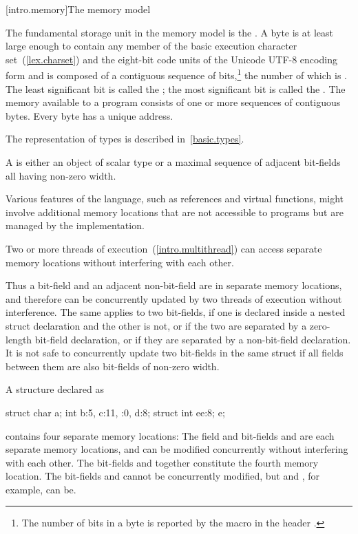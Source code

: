 [intro.memory]{The \Cpp memory model}

\pnum
{}%
The fundamental storage unit in the \Cpp memory model is the
.
A byte is at least large enough to contain any member of the basic
%
execution character set~(\ref{lex.charset})
and the eight-bit code units of the Unicode UTF-8 encoding form
and is composed of a contiguous sequence of
bits,\footnote{The number of bits in a byte is reported by the macro
 in the header .}
the number of which is . The least
significant bit is called the ; the most
significant bit is called the . The memory
available to a \Cpp program consists of one or more sequences of
contiguous bytes. Every byte has a unique address.

\pnum
\begin{note} The representation of types is described
in~\ref{basic.types}. \end{note}

\pnum
A  is either an object of scalar type or a maximal
sequence of adjacent bit-fields all having non-zero width. \begin{note} Various
features of the language, such as references and virtual functions, might
involve additional memory locations that are not accessible to programs but are
managed by the implementation. \end{note} Two or more threads of
execution~(\ref{intro.multithread}) can access separate memory
locations without interfering with each other.

\pnum
\begin{note} Thus a bit-field and an adjacent non-bit-field are in separate memory
locations, and therefore can be concurrently updated by two threads of execution
without interference. The same applies to two bit-fields, if one is declared
inside a nested struct declaration and the other is not, or if the two are
separated by a zero-length bit-field declaration, or if they are separated by a
non-bit-field declaration. It is not safe to concurrently update two bit-fields
in the same struct if all fields between them are also bit-fields of non-zero
width. \end{note}

\pnum
\begin{example} A structure declared as

\begin{codeblock}
struct {
  char a;
  int b:5,
  c:11,
  :0,
  d:8;
  struct {int ee:8;} e;
}
\end{codeblock}

contains four separate memory locations: The field  and bit-fields
 and  are each separate memory locations, and can be
modified concurrently without interfering with each other. The bit-fields
 and  together constitute the fourth memory location. The
bit-fields  and  cannot be concurrently modified, but
 and , for example, can be. \end{example}%

